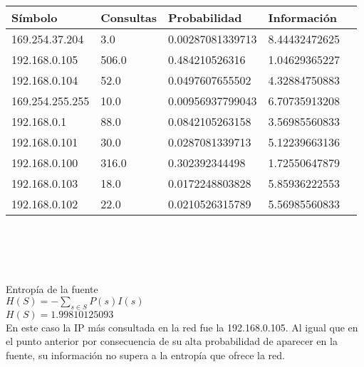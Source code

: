 \begin{tabular}{|l|l|l|l|l|}
  \hline
  S\'imbolo & Consultas & Probabilidad & Informaci\'on \\
  \hline
  169.254.37.204 & 3.0 & 0.00287081339713 & 8.44432472625\\
  \hline
  192.168.0.105 & 506.0 & 0.484210526316 & 1.04629365227\\
  \hline
  192.168.0.104 & 52.0 & 0.0497607655502 & 4.32884750883\\
  \hline
  169.254.255.255 & 10.0 & 0.00956937799043 & 6.70735913208\\
  \hline
  192.168.0.1 & 88.0 & 0.0842105263158 & 3.56985560833\\
  \hline
  192.168.0.101 & 30.0 & 0.0287081339713 & 5.12239663136\\
  \hline
  192.168.0.100 & 316.0 & 0.302392344498 & 1.72550647879\\
  \hline
  192.168.0.103 & 18.0 & 0.0172248803828 & 5.85936222553\\
  \hline
  192.168.0.102 & 22.0 & 0.0210526315789 & 5.56985560833\\
  \hline
\end{tabular}\\
\\ \ \\ \ \\ 
Entrop\'ia de la fuente\\
$H(S) = -\sum_{s \in S} P(s) I(s)$\\
$H(S) = 1.99810125093$\\

En este caso la IP m\'as consultada en la red fue la 192.168.0.105. Al igual que en el punto anterior por consecuencia de su alta probabilidad de aparecer en la fuente, su informaci\'on no supera a la entrop\'ia que ofrece la red.

